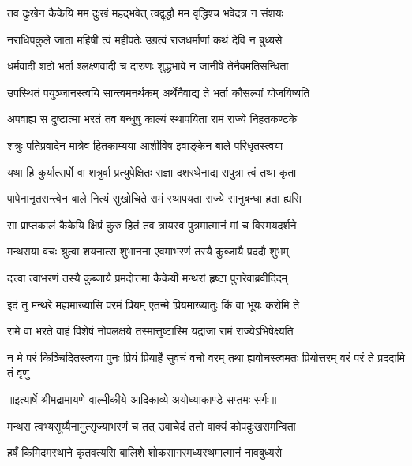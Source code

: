 \twolineshloka
{तव दुःखेन कैकेयि मम दुःखं महद्भवेत्}
{त्वद्वृद्धौ मम वृद्धिश्च भवेदत्र न संशयः} %

\twolineshloka
{नराधिपकुले जाता महिषी त्वं महीपतेः}
{उग्रत्वं राजधर्माणां कथं देवि न बुध्यसे} %

\twolineshloka
{धर्मवादी शठो भर्ता श्लक्ष्णवादी च दारुणः}
{शुद्धभावे न जानीषे तेनैवमतिसन्धिता} %

\twolineshloka
{उपस्थितं पयुञ्जानस्त्वयि सान्त्वमनर्थकम्}
{अर्थेनैवाद्य ते भर्ता कौसल्यां योजयिष्यति} %

\twolineshloka
{अपवाह्य स दुष्टात्मा भरतं तव बन्धुषु}
{काल्यं स्थापयिता रामं राज्ये निहतकण्टके} %

\twolineshloka
{शत्रुः पतिप्रवादेन मात्रेव हितकाम्यया}
{आशीविष इवाङ्केन बाले परिधृतस्त्वया} %

\twolineshloka
{यथा हि कुर्यात्सर्पो वा शत्रुर्वा प्रत्युपेक्षितः}
{राज्ञा दशरथेनाद्य सपुत्रा त्वं तथा कृता} %

\twolineshloka
{पापेनानृतसन्त्वेन बाले नित्यं सुखोचिते}
{रामं स्थापयता राज्ये सानुबन्धा हता ह्यसि} %

\twolineshloka
{सा प्राप्तकालं कैकेयि क्षिप्रं कुरु हितं तव}
{त्रायस्व पुत्रमात्मानं मां च विस्मयदर्शने} %

\twolineshloka
{मन्थराया वचः श्रुत्वा शयनात्स शुभानना}
{एवमाभरणं तस्यै कुब्जायै प्रददौ शुभम्} %

\twolineshloka
{दत्त्वा त्वाभरणं तस्यै कुब्जायै प्रमदोत्तमा}
{कैकेयी मन्थरां हृष्टा पुनरेवाब्रवीदिदम्} %

\twolineshloka
{इदं तु मन्थरे मह्यमाख्यासि परमं प्रियम्}
{एतन्मे प्रियमाख्यातुः किं वा भूयः करोमि ते} %

\twolineshloka
{रामे वा भरते वाहं विशेषं नोपलक्षये}
{तस्मात्तुष्टास्मि यद्राजा रामं राज्येऽभिषेक्ष्यति} %

\fourlineindentedshloka
{न मे परं किञ्चिदितस्त्वया पुनः}
{प्रियं प्रियार्हे सुवचं वचो वरम्}
{तथा ह्यवोचस्त्वमतः प्रियोत्तरम्}
{वरं परं ते प्रददामि तं वृणु} %


{॥इत्यार्षे श्रीमद्रामायणे वाल्मीकीये आदिकाव्ये अयोध्याकाण्डे सप्तमः सर्गः॥}


\twolineshloka
{मन्थरा त्वभ्यसूय्यैनामुत्सृज्याभरणं च तत्}
{उवाचेदं ततो वाक्यं कोपदुःखसमन्विता} %

\twolineshloka
{हर्षं किमिदमस्थाने कृतवत्यसि बालिशे}
{शोकसागरमध्यस्थमात्मानं नावबुध्यसे} %

